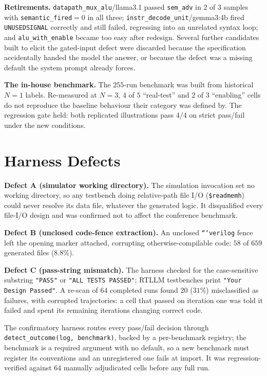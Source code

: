 \documentclass[11pt]{article}
\newcommand{\cond}[1]{\texttt{#1}}
\begin{document}
\textbf{Retirements.} \texttt{datapath\_mux\_alu}/llama3.1 passed
\cond{sem\_adv} in $2$ of $3$ samples with \cond{semantic\_fired}${=}0$ in all
three; \texttt{instr\_decode\_unit}/gemma3:4b fired \cond{UNUSEDSIGNAL}
correctly and still failed, regressing into an unrelated syntax loop; and
\texttt{alu\_with\_enable} became too easy after redesign. Several further
candidates built to elicit the gated-input defect were discarded because the
specification accidentally handed the model the answer, or because the defect
was a missing default the system prompt already forces.

\textbf{The in-house benchmark.} The $255$-run benchmark was built from
historical $N{=}1$ labels. Re-measured at $N{=}3$, $4$ of $5$ ``real-test'' and
$2$ of $3$ ``enabling'' cells do not reproduce the baseline behaviour their
category was defined by. The regression gate held: both replicated
illustrations pass $4/4$ on strict pass/fail under the new conditions.

\section{Harness Defects}
\label{s:harness}

\textbf{Defect A (simulator working directory).} The simulation invocation set
no working directory, so any testbench doing relative-path file I/O
(\texttt{\$readmemh}) could never resolve its data file, whatever the generated
logic. It disqualified every file-I/O design and was confirmed not to affect the
conference benchmark.

\textbf{Defect B (unclosed code-fence extraction).} An unclosed
\texttt{```verilog} fence left the opening marker attached, corrupting
otherwise-compilable code: $58$ of $659$ generated files ($8.8\%$).

\textbf{Defect C (pass-string mismatch).} The harness checked for the
case-sensitive substring \texttt{"PASS"} or \texttt{"ALL TESTS PASSED"}; RTLLM
testbenches print \texttt{"Your Design Passed"}. A re-scan of $64$ completed
runs found $20$ ($31\%$) misclassified as failures, with corrupted trajectories:
a cell that passed on iteration one was told it failed and spent its remaining
iterations changing correct code.

The confirmatory harness routes every pass/fail decision through
\texttt{detect\_outcome(log, benchmark)}, backed by a per-benchmark registry;
the benchmark is a required argument with no default, so a new benchmark must
register its conventions and an unregistered one fails at import. It was
regression-verified against $64$ manually adjudicated cells before any full run.
\end{document}

